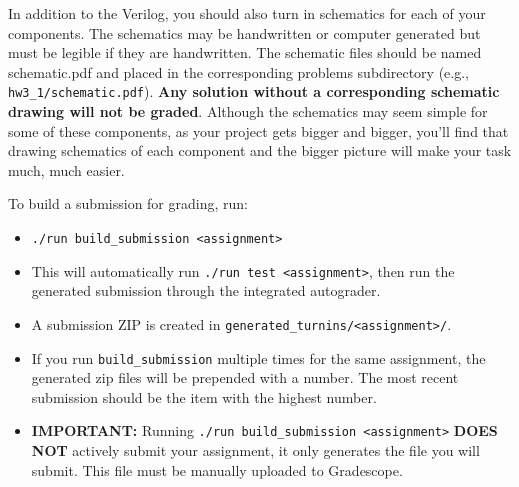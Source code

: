\documentclass[12pt]{article}
\begin{document}
In addition to the Verilog, you should also turn in schematics for each of your components. The schematics
may be handwritten or computer generated but must be legible if they are handwritten. The schematic files
should be named schematic.pdf and placed in the corresponding problems subdirectory (e.g.,
\texttt{hw3\_1/schematic.pdf}). \textbf{Any solution without a corresponding schematic drawing will not be graded}.
Although the schematics may seem simple for some of these components, as your project gets bigger and
bigger, you’ll find that drawing schematics of each component and the bigger picture will make your task
much, much easier.

To build a submission for grading, run:
\begin{itemize}
\item \texttt{./run build\_submission <assignment>}
\item This will automatically run \texttt{./run test <assignment>}, then run the generated submission
through the integrated autograder.
\item A submission ZIP is created in \texttt{generated\_turnins/<assignment>/}.
\item If you run \texttt{build\_submission} multiple times for the same assignment, the generated zip files will be prepended with a number. The most recent submission should be the item with the highest number.
\item \textbf{IMPORTANT:} Running \texttt{./run build\_submission <assignment>} \textbf{DOES NOT} actively submit your assignment, it only generates the file you will submit. This file must be manually uploaded to Gradescope.
\end{itemize}
\end{document}
